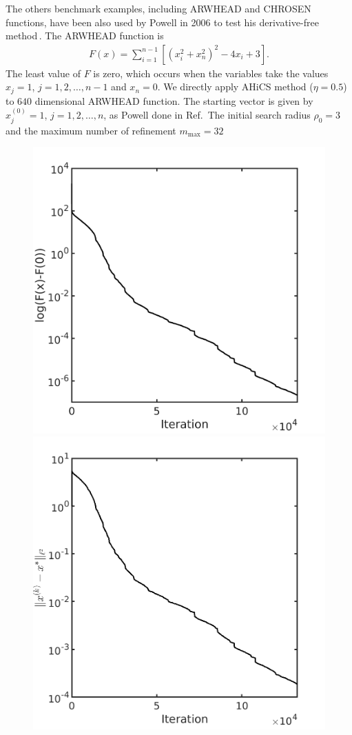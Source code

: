 \documentclass[final,1p,times]{elsarticle}
\begin{document}
The others benchmark examples, including ARWHEAD and CHROSEN
functions, have been also used by Powell in 2006 to test his
derivative-free method\,\cite{powell2006newuoa}. The ARWHEAD
function is
\begin{align}
	F(x) = \sum_{i=1}^{n-1}[(x_i^2+x_n^2)^2 - 4 x_i +3].
	\label{}
\end{align}
The least value of $F$ is zero, which occurs when the variables take the values
$x_j=1$, $j=1,2,\dots,n-1$ and $x_n=0$. 
We directly apply AHiCS method ($\eta=0.5$) to $640$ dimensional ARWHEAD function.
The starting vector is given by $x_j^{(0)}=1$, $j=1,2,\dots,n$, as
Powell done in Ref.\,\cite{powell2006newuoa}
The initial search radius $\rho_0=3$ and the maximum number of
refinement $m_{\max}=32$
\begin{figure}[!htbp]
	\centering
	  \includegraphics[scale=0.18]{../figures/arwhead640D.png}
	  \includegraphics[scale=0.174]{../figures/arwhead640D_dist.png}

\end{figure}
\end{document}

